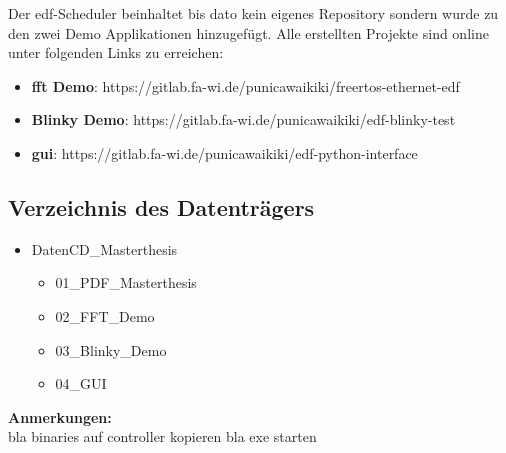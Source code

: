 \documentclass[../EDF Master Thesis.tex]{subfiles}
\begin{document}
Der \ac{edf}-Scheduler beinhaltet bis dato kein eigenes Repository sondern wurde zu den zwei Demo Applikationen hinzugefügt.
Alle erstellten Projekte sind online unter folgenden Links zu erreichen:

\begin{itemize}
    \item \textbf{\ac{fft} Demo}: https://gitlab.fa-wi.de/punicawaikiki/freertos-ethernet-edf
    \item \textbf{Blinky Demo}: https://gitlab.fa-wi.de/punicawaikiki/edf-blinky-test
    \item \textbf{\ac{gui}}: https://gitlab.fa-wi.de/punicawaikiki/edf-python-interface
\end{itemize}

\subsection{Verzeichnis des Datenträgers}

\begin{itemize}
    \item Daten\-CD\_Masterthesis
    \begin{itemize}
        \item 01\_PDF\_Masterthesis
        \item 02\_FFT\_Demo
        \item 03\_Blinky\_Demo
        \item 04\_GUI
    \end{itemize}
\end{itemize}

\textbf{Anmerkungen:}\\
bla binaries auf controller kopieren
bla exe starten
\end{document}
